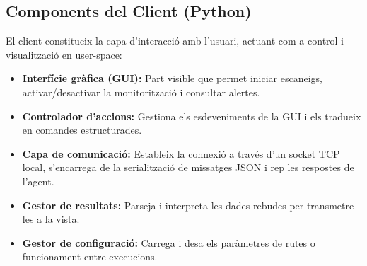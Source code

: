 \documentclass[12pt,a4paper]{report}
\begin{document}
\subsection{Components del Client (Python)}
El client constitueix la capa d'interacció amb l'usuari, actuant com a control i visualització en user-space:
\begin{itemize}
    \item \textbf{Interfície gràfica (GUI):} Part visible que permet iniciar escaneigs, activar/desactivar la monitorització i consultar alertes.
    \item \textbf{Controlador d'accions:} Gestiona els esdeveniments de la GUI i els tradueix en comandes estructurades.
    \item \textbf{Capa de comunicació:} Estableix la connexió a través d'un socket TCP local, s'encarrega de la serialització de missatges JSON i rep les respostes de l'agent.
    \item \textbf{Gestor de resultats:} Parseja i interpreta les dades rebudes per transmetre-les a la vista.
    \item \textbf{Gestor de configuració:} Carrega i desa els paràmetres de rutes o funcionament entre execucions.
\end{itemize}
\end{document}
